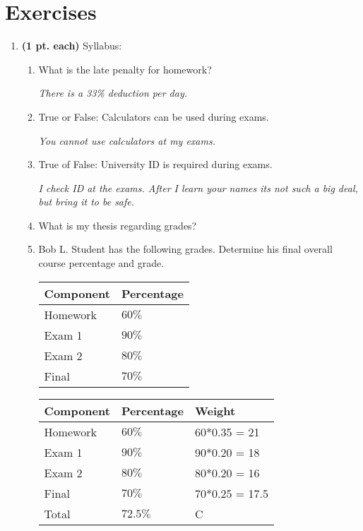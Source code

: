 \section{Exercises}
\label{section:chap01Exercises}

\begin{enumerate}
\item \textbf{ (1 pt. each)} Syllabus:
	\begin{enumerate}
	\item What is the late penalty for homework?
	
	\begin{onlysolution}
	\itshape
	There is a 33\% deduction per day.
	\end{onlysolution}

	\item True or False: Calculators can be used during exams.
	
	\begin{onlysolution}
	\itshape
	You cannot use calculators at my exams.
	\end{onlysolution}
	
	
	\item True of False: University ID is required during exams.
	
		
	\begin{onlysolution}
	\itshape
	I check ID at the exams.  After I learn 
		your names its not such a big
		deal, but bring it to be safe.
	\end{onlysolution}
	
	\item What is my thesis regarding grades?
	\item Bob L. Student has the following grades.  Determine his final
	overall course percentage and grade.

		\begin{tabular}{l|l}
		Component & Percentage \\ \hline \hline
		Homework & $60\%$ \\ \hline
		Exam 1	 & $90\%$ \\ \hline
		Exam 2	 & $80\%$ \\ \hline
		Final	 & $70\%$ \\ 
		\end{tabular}


	\begin{onlysolution}
	\itshape
                \begin{tabular}{l|l|l}
                Component & Percentage & Weight \\ \hline \hline
                Homework & $60\%$    & 60*0.35 = 21\\ \hline
                Exam 1   & $90\%$    & 90*0.20 = 18\\ \hline
                Exam 2   & $80\%$    & 80*0.20 = 16\\ \hline
                Final    & $70\%$    & 70*0.25 = 17.5 \\ \hline
                Total    & $72.5\%$ & C \\
                \end{tabular}
	\end{onlysolution}


\end{enumerate}
\end{enumerate}
